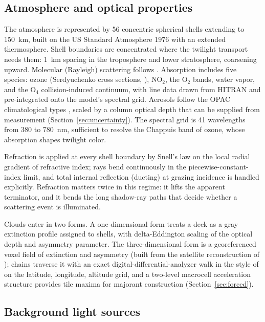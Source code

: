 \documentclass[preprint,12pt]{elsarticle}
\begin{document}
\subsection{Atmosphere and optical properties}
\label{sec:atmosphere}

The atmosphere is represented by 56 concentric spherical shells extending
to 150~km, built on the US Standard Atmosphere 1976 with an extended
thermosphere. Shell boundaries are concentrated where the twilight
transport needs them: 1~km spacing in the troposphere and lower
stratosphere, coarsening upward. Molecular (Rayleigh) scattering follows
\citet{bodhaine1999}. Absorption includes five species: ozone
(Serdyuchenko cross sections, \citealp{serdyuchenko2014}), NO$_2$, the
O$_2$ bands, water vapor, and the O$_4$ collision-induced continuum, with
line data drawn from HITRAN \citep{gordon2022} and pre-integrated onto the
model's spectral grid. Aerosols follow the OPAC climatological types
\citep{hess1998}, scaled by a column optical depth that can be supplied
from measurement (Section~\ref{sec:uncertainty}). The spectral grid is 41
wavelengths from 380 to 780~nm, sufficient to resolve the Chappuis band of
ozone, whose absorption shapes twilight color.

Refraction is applied at every shell boundary by Snell's law on the local
radial gradient of refractive index; rays bend continuously in the
piecewise-constant-index limit, and total internal reflection (ducting) at
grazing incidence is handled explicitly. Refraction matters twice in this
regime: it lifts the apparent terminator, and it bends the long shadow-ray
paths that decide whether a scattering event is illuminated.

Clouds enter in two forms. A one-dimensional form treats a deck as a gray
extinction profile assigned to shells, with delta-Eddington scaling of the
optical depth and asymmetry parameter. The three-dimensional form is a
georeferenced voxel field of extinction and asymmetry (built from
the satellite reconstruction of \citealp{aybar2025}); chains
traverse it with an exact digital-differential-analyzer walk in the
style of \citet{amanatides1987} on the latitude, longitude, altitude grid, and
a two-level macrocell acceleration structure provides tile maxima for
majorant construction (Section~\ref{sec:forced}).

\subsection{Background light sources}
\label{sec:backgrounds}
\end{document}
